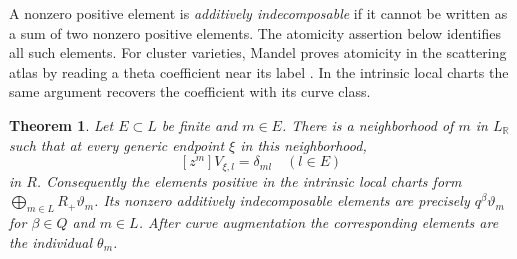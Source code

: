 \documentclass[11pt,reqno]{amsart}
\numberwithin{equation}{section}
\newtheorem{theorem}{Theorem}[section]
\theoremstyle{definition}
\theoremstyle{remark}
\begin{document}
A nonzero positive element is \emph{additively indecomposable} if it
cannot be written as a sum of two nonzero positive elements. The
atomicity assertion below identifies all such elements.
For cluster varieties, Mandel proves atomicity in the scattering atlas
by reading a theta coefficient near its label
\cite[Theorem~1]{MandelAtomic}. In the intrinsic local charts the
same argument recovers the coefficient with its curve class.

\begin{theorem}\label{thm:intrinsic-atomicity}
Let \(E\subset L\) be finite and \(m\in E\). There is a neighborhood
of \(m\) in \(L_{\mathbb R}\) such that at every generic endpoint
\(\xi\) in this neighborhood,
\[ [z^m]V_{\xi,l}=\delta_{ml}\quad(l\in E) \]
in \(R\). Consequently the elements positive in the intrinsic local
charts form \(\bigoplus_{m\in L}R_+\vartheta_m\). Its nonzero
additively indecomposable elements are precisely
\(q^\beta\vartheta_m\) for \(\beta\in Q\) and \(m\in L\).
After curve augmentation the corresponding elements are the
individual \(\theta_m\).
\end{theorem}
\end{document}
